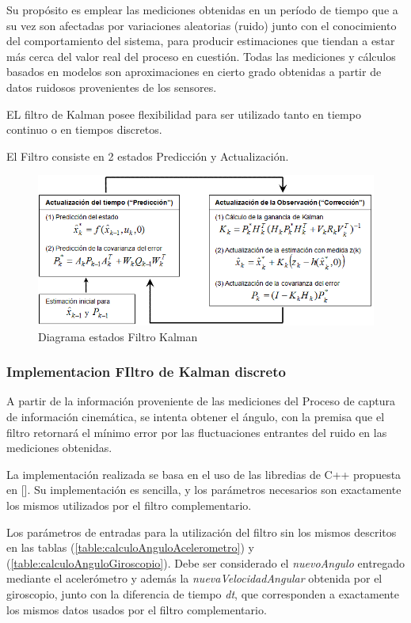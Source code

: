 \documentclass[12pt,a4paper]{article}
\begin{document}
Su propósito es emplear las mediciones obtenidas en un período de tiempo que a su vez son afectadas por variaciones  aleatorias (ruido) junto con el conocimiento del comportamiento del sistema, para producir estimaciones que tiendan a estar más cerca del valor real del proceso en cuestión. Todas las mediciones y cálculos basados en modelos son aproximaciones en cierto grado obtenidas a partir de datos ruidosos provenientes de los sensores.

EL filtro de Kalman posee flexibilidad para ser utilizado tanto en tiempo continuo o en tiempos discretos.

El Filtro consiste en 2 estados Predicción y Actualización.

\begin{figure}[H]
	\centering
	\includegraphics[scale=0.65]{images/kalman-filter.png} 
	\caption{Diagrama estados Filtro Kalman}
	\label{fig:diagramakalman}
\end{figure}

\subsubsection{Implementacion FIltro de Kalman discreto}
A partir de la información proveniente de las mediciones del Proceso de captura de información cinemática, se intenta obtener el ángulo, con la premisa que el filtro retornará el mínimo error por las fluctuaciones entrantes del ruido en las mediciones obtenidas.

La implementación realizada se basa en el uso de las libredias de C++ propuesta en [\cite{kalmanTKJ}]. Su implementación es sencilla, y los parámetros necesarios son exactamente los mismos utilizados por el filtro complementario.

Los parámetros de entradas para la utilización del filtro sin los mismos descritos en las tablas (\ref{table:calculoAnguloAcelerometro}) y (\ref{table:calculoAnguloGiroscopio}).
Debe ser considerado el \textit{nuevoAngulo} entregado mediante el acelerómetro y además la \textit{nuevaVelocidadAngular} obtenida por el giroscopio, junto con la diferencia de tiempo \textit{dt}, que corresponden a exactamente los mismos datos usados por el filtro complementario.
\end{document}
